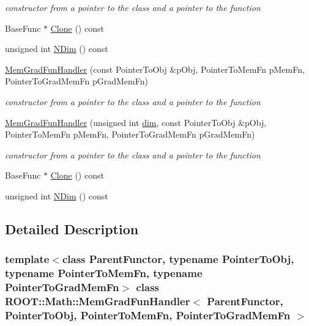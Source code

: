 \begin{DoxyCompactItemize}
\begin{DoxyCompactList}\small\item\em constructor from a pointer to the class and a pointer to the function \end{DoxyCompactList}\item 
Base\+Func $\ast$ \mbox{\hyperlink{classROOT_1_1Math_1_1MemGradFunHandler_a987e3b1a8492990c3c2a5c3eca9964a6}{Clone}} () const
\item 
unsigned int \mbox{\hyperlink{classROOT_1_1Math_1_1MemGradFunHandler_acdd729dc718e1ecf3bac32af990904b4}{N\+Dim}} () const
\item 
\mbox{\hyperlink{classROOT_1_1Math_1_1MemGradFunHandler_afb840379796fb7d05d885bc3152a3175}{Mem\+Grad\+Fun\+Handler}} (const Pointer\+To\+Obj \&p\+Obj, Pointer\+To\+Mem\+Fn p\+Mem\+Fn, Pointer\+To\+Grad\+Mem\+Fn p\+Grad\+Mem\+Fn)
\begin{DoxyCompactList}\small\item\em constructor from a pointer to the class and a pointer to the function \end{DoxyCompactList}\item 
\mbox{\hyperlink{classROOT_1_1Math_1_1MemGradFunHandler_a1e421d0a42589a826fd0b9f7f1a475ec}{Mem\+Grad\+Fun\+Handler}} (unsigned int \mbox{\hyperlink{adat__devel_2lib_2hadron_2irrep__util_8cc_a70b5e28b5bc3d1b63a7435c5fe50b837}{dim}}, const Pointer\+To\+Obj \&p\+Obj, Pointer\+To\+Mem\+Fn p\+Mem\+Fn, Pointer\+To\+Grad\+Mem\+Fn p\+Grad\+Mem\+Fn)
\begin{DoxyCompactList}\small\item\em constructor from a pointer to the class and a pointer to the function \end{DoxyCompactList}\item 
Base\+Func $\ast$ \mbox{\hyperlink{classROOT_1_1Math_1_1MemGradFunHandler_a987e3b1a8492990c3c2a5c3eca9964a6}{Clone}} () const
\item 
unsigned int \mbox{\hyperlink{classROOT_1_1Math_1_1MemGradFunHandler_acdd729dc718e1ecf3bac32af990904b4}{N\+Dim}} () const
\end{DoxyCompactItemize}


\subsection{Detailed Description}
\subsubsection*{template$<$class Parent\+Functor, typename Pointer\+To\+Obj, typename Pointer\+To\+Mem\+Fn, typename Pointer\+To\+Grad\+Mem\+Fn$>$\newline
class R\+O\+O\+T\+::\+Math\+::\+Mem\+Grad\+Fun\+Handler$<$ Parent\+Functor, Pointer\+To\+Obj, Pointer\+To\+Mem\+Fn, Pointer\+To\+Grad\+Mem\+Fn $>$}

